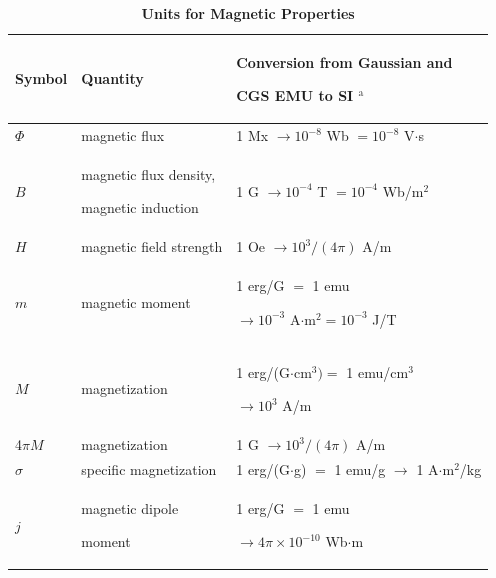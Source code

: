 \documentclass{ieeeaccess}
\begin{document}
\begin{table}
    \caption{\textbf{Units for Magnetic Properties}}
    \label{table}
    \setlength{\tabcolsep}{3pt}
    \begin{tabular}{|p{25pt}|p{75pt}|p{115pt}|}
        \hline
        Symbol                                         &
        Quantity                                       &
        Conversion from Gaussian and \par CGS EMU to SI $^{\mathrm{a}}$                 \\
        \hline
        $\Phi $                                        &
        magnetic flux                                  &
        1 Mx $\to  10^{-8}$ Wb $= 10^{-8}$ V$\cdot $s                                   \\
        $B$                                            &
        magnetic flux density, \par magnetic induction &
        1 G $\to  10^{-4}$ T $= 10^{-4}$ Wb/m$^{2}$                                     \\
        $H$                                            &
        magnetic field strength                        &
        1 Oe $\to  10^{3}/(4\pi )$ A/m                                                  \\
        $m$                                            &
        magnetic moment                                &
        1 erg/G $=$ 1 emu \par $\to 10^{-3}$ A$\cdot $m$^{2} = 10^{-3}$ J/T             \\
        $M$                                            &
        magnetization                                  &
        1 erg/(G$\cdot $cm$^{3}) =$ 1 emu/cm$^{3}$ \par $\to 10^{3}$ A/m                \\
        4$\pi M$                                       &
        magnetization                                  &
        1 G $\to  10^{3}/(4\pi )$ A/m                                                   \\
        $\sigma $                                      &
        specific magnetization                         &
        1 erg/(G$\cdot $g) $=$ 1 emu/g $\to $ 1 A$\cdot $m$^{2}$/kg                     \\
        $j$                                            &
        magnetic dipole \par moment                    &
        1 erg/G $=$ 1 emu \par $\to 4\pi \times  10^{-10}$ Wb$\cdot $m                  \\

\end{tabular}
\end{table}
\end{document}
